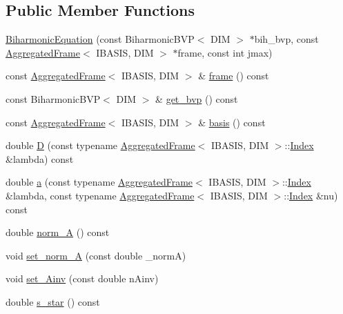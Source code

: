 \subsection*{Public Member Functions}
\begin{CompactItemize}
\item 
\hyperlink{classFrameTL_1_1BiharmonicEquation_92657a3e07a5df0a73cb50563212a081}{BiharmonicEquation} (const BiharmonicBVP$<$ DIM $>$ $\ast$bih\_\-bvp, const \hyperlink{classFrameTL_1_1AggregatedFrame}{AggregatedFrame}$<$ IBASIS, DIM $>$ $\ast$frame, const int jmax)
\item 
const \hyperlink{classFrameTL_1_1AggregatedFrame}{AggregatedFrame}$<$ IBASIS, DIM $>$ \& \hyperlink{classFrameTL_1_1BiharmonicEquation_4c9be93d423d6e61f61fa31b998d559d}{frame} () const 
\item 
const BiharmonicBVP$<$ DIM $>$ \& \hyperlink{classFrameTL_1_1BiharmonicEquation_b688202abfc6f7d72a04dbf365ba6809}{get\_\-bvp} () const 
\item 
const \hyperlink{classFrameTL_1_1AggregatedFrame}{AggregatedFrame}$<$ IBASIS, DIM $>$ \& \hyperlink{classFrameTL_1_1BiharmonicEquation_f197bfb03a8f123739a3311d803a1803}{basis} () const 
\item 
double \hyperlink{classFrameTL_1_1BiharmonicEquation_d16c3e0cfbdc25d321fece0ce1e7069e}{D} (const typename \hyperlink{classFrameTL_1_1AggregatedFrame}{AggregatedFrame}$<$ IBASIS, DIM $>$::\hyperlink{classFrameTL_1_1FrameIndex}{Index} \&lambda) const 
\item 
double \hyperlink{classFrameTL_1_1BiharmonicEquation_7e489f4287862dad10b3334316bf786a}{a} (const typename \hyperlink{classFrameTL_1_1AggregatedFrame}{AggregatedFrame}$<$ IBASIS, DIM $>$::\hyperlink{classFrameTL_1_1FrameIndex}{Index} \&lambda, const typename \hyperlink{classFrameTL_1_1AggregatedFrame}{AggregatedFrame}$<$ IBASIS, DIM $>$::\hyperlink{classFrameTL_1_1FrameIndex}{Index} \&nu) const 
\item 
double \hyperlink{classFrameTL_1_1BiharmonicEquation_14e15fda0b1f3cc901cb3a3026ceb536}{norm\_\-A} () const 
\item 
void \hyperlink{classFrameTL_1_1BiharmonicEquation_731c3491306a23684256fe4dede66b53}{set\_\-norm\_\-A} (const double \_\-normA)
\item 
void \hyperlink{classFrameTL_1_1BiharmonicEquation_390c7b64b0183610aede9842c805804e}{set\_\-Ainv} (const double nAinv)
\item 
double \hyperlink{classFrameTL_1_1BiharmonicEquation_c619e416f851afd5a307014a69cc6d35}{s\_\-star} () const 

\end{CompactItemize}
